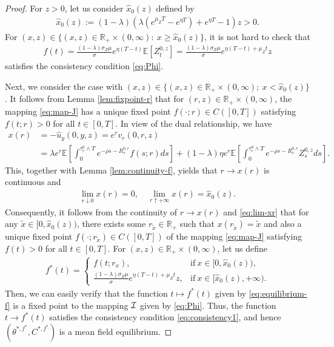 \documentclass[11pt,times,letter]{article}
\newcommand{\Ex}{ \mathbb{E} }
\newcommand{\R}{\mathds{R}}
\numberwithin{equation}{section}
\begin{document}
\begin{proof}
 For $z>0$, let us consider $\hat{x}_0(z)$ defined by
\begin{align}\label{eq:hat-x}
\hat{x}_0(z):=(1-\lambda)\left(\lambda\left(e^{\mu_Z T}-e^{\eta T}\right)+e^{\eta T}-1\right)z>0.
\end{align} 
For $(x,z)\in\{(x,z)\in \R_+\times (0,\infty):~x\geq \hat{x}_0(z)\}$, it is not hard to check that
\begin{align}
f(t)=\frac{(1-\lambda)\sigma_Z\mu}{\sigma}e^{\eta (T-t)}\Ex\left[Z_t^{0,z}\right]=\frac{(1-\lambda)\sigma_Z\mu}{\sigma}e^{\eta (T-t)+\mu_Z t}z
\end{align}
satisfies the consistency condition \eqref{eq:Phi}. 

Next, we consider the case with $(x,z)\in\{(x,z)\in \R_+\times (0,\infty);~x< \hat{x}_0(z)\}$. It follows from Lemma \ref{lem:fixpoint-r} that for $(r,z)\in \R_+\times (0,\infty)$, the mapping \eqref{eq:map-J} has a unique fixed point $f(\cdot;r)\in C([0,T])$ satisfying $f(t;r)>0$ for all $t\in[0,T]$. In view of the dual relationship, we have 
\begin{align}\label{eq:x-r}
x(r)&=-\hat{u}_y(0,y,z)=e^{r}v_r(0,r,z)\\
&=\lambda e^{r}\mathbb{E}\left[\int_0^{\tau_r^0 \wedge T} e^{-\rho s-R_s^{0, r}} f(s;r)ds\right]+(1-\lambda)\eta  e^{r}\Ex\left[ \int_0^{\tau_r^0 \wedge T}e^{-\rho s-R^{0,r}_s}Z_s^{0,z} ds\right].
\end{align}
 This, together with Lemma \ref{lem:continuity-f}, yields that $r\to x(r)$ is continuous and 
\begin{align}\label{eq:lim-xr}
\lim_{r\downarrow 0}x(r)=0,\quad \lim_{r\uparrow +\infty}x(r)=\hat{x}_0(z).
\end{align}
Consequently, it follows from the continuity of $r\to x(r)$ and \eqref{eq:lim-xr} that for any $\tilde{x}\in [0,\hat{x}_0(z))$, there exists some $r_{\tilde{x}}\in \R_+$ such that $x(r_{\tilde{x}})=\tilde{x}$ and also a unique fixed point $f(\cdot;r_{\tilde{x}})\in C([0,T])$ of the mapping \eqref{eq:map-J} satisfying $f(t)>0$ for all $t\in[0,T]$. For $(x,z)\in\R_+\times (0,\infty)$, let us define
\begin{align}\label{eq:equilibrium-f}
f^*(t)=
\begin{cases}
\displaystyle f(t;r_x),&\text{if}~x\in[0,\hat{x}_0(z)),\\[1em]
\displaystyle \frac{(1-\lambda)\sigma_Z\mu}{\sigma}e^{\eta (T-t)+\mu_Z t}z,&\text{if}~x \in[\hat{x}_0(z),+\infty).
\end{cases}
\end{align}
Then, we can easily verify that the function $t\mapsto f^*(t)$ given by \eqref{eq:equilibrium-f} is a fixed point to the mapping ${\cal I}$ given by \eqref{eq:Phi}. Thus,  the function $t\to f^*(t)$ satisfies the consistency condition \eqref{eq:consistency1}, and hence $(\theta^{*,f^*},C^{*,f^*})$ is a mean field equilibrium.
\end{proof}
\end{document}
